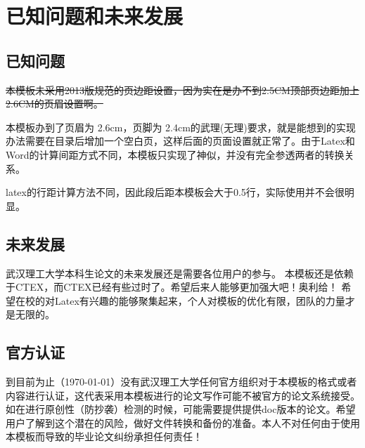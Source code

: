 \section{已知问题和未来发展}
\subsection{已知问题}
\sout{本模板未采用2013版规范的页边距设置，因为实在是办不到2.5CM顶部页边距加上2.6CM的页眉设置啊。}

本模板办到了页眉为 2.6cm，页脚为 2.4cm的武理(无理)要求，就是能想到的实现办法需要在目录后增加一个空白页，这样后面的页面设置就正常了。由于Latex和Word的计算间距方式不同，本模板只实现了神似，并没有完全参透两者的转换关系。

latex的行距计算方法不同，因此段后距本模板会大于0.5行，实际使用并不会很明显。

\subsection{未来发展}
武汉理工大学本科生论文的未来发展还是需要各位用户的参与。
本模板还是依赖于CTEX，而CTEX已经有些过时了。希望后来人能够更加强大吧！奥利给！
希望在校的对Latex有兴趣的能够聚集起来，个人对模板的优化有限，团队的力量才是无限的。

\subsection{官方认证}
到目前为止（\today ）没有武汉理工大学任何官方组织对于本模板的格式或者内容进行认证，这代表采用本模板进行的论文写作可能不被官方的论文系统接受。如在进行原创性（防抄袭）检测的时候，可能需要提供提供doc版本的论文。希望用户了解到这个潜在的风险，做好文件转换和备份的准备。本人不对任何由于使用本模板而导致的毕业论文纠纷承担任何责任！